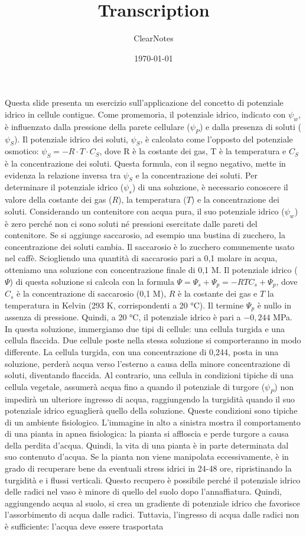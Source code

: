\documentclass[11pt, a4paper]{article}
\title{Transcription}
\author{ClearNotes}
\date{\today}
\begin{document}
\maketitle
\begin{spacing}{1.15}
Questa slide presenta un esercizio sull'applicazione del concetto di potenziale idrico in cellule contigue. Come promemoria, il potenziale idrico, indicato con $\psi_w$, è influenzato dalla pressione della parete cellulare ($\psi_P$) e dalla presenza di soluti ($\psi_S$). Il potenziale idrico dei soluti, $\psi_S$, è calcolato come l'opposto del potenziale osmotico: $\psi_S = -R \cdot T \cdot C_S$, dove R è la costante dei gas, T è la temperatura e $C_S$ è la concentrazione dei soluti. Questa formula, con il segno negativo, mette in evidenza la relazione inversa tra $\psi_S$ e la concentrazione dei soluti. Per determinare il potenziale idrico ($\psi_s$) di una soluzione, è necessario conoscere il valore della costante dei gas ($R$), la temperatura ($T$) e la concentrazione dei soluti. Considerando un contenitore con acqua pura, il suo potenziale idrico ($\psi_w$) è zero perché non ci sono soluti né pressioni esercitate dalle pareti del contenitore. Se si aggiunge saccarosio, ad esempio una bustina di zucchero, la concentrazione dei soluti cambia. Il saccarosio è lo zucchero comunemente usato nel caffè. Sciogliendo una quantità di saccarosio pari a 0,1 molare in acqua, otteniamo una soluzione con concentrazione finale di 0,1 M. Il potenziale idrico ($\Psi$) di questa soluzione si calcola con la formula $\Psi = \Psi_s + \Psi_p = -RTC_s + \Psi_p$, dove $C_s$ è la concentrazione di saccarosio (0,1 M), $R$ è la costante dei gas e $T$ la temperatura in Kelvin (293 K, corrispondenti a 20 °C).  Il termine $\Psi_p$ è nullo in assenza di pressione. Quindi, a 20 °C, il potenziale idrico è pari a $-0,244$ MPa. In questa soluzione, immergiamo due tipi di cellule: una cellula turgida e una cellula flaccida. Due cellule poste nella stessa soluzione si comporteranno in modo differente. La cellula turgida, con una concentrazione di 0,244, posta in una soluzione, perderà acqua verso l'esterno a causa della minore concentrazione di soluti, diventando flaccida. Al contrario, una cellula in condizioni tipiche di una cellula vegetale, assumerà acqua fino a quando il potenziale di turgore ($\psi_P$) non impedirà un ulteriore ingresso di acqua, raggiungendo la turgidità quando il suo potenziale idrico eguaglierà quello della soluzione. Queste condizioni sono tipiche di un ambiente fisiologico.  L'immagine in alto a sinistra mostra il comportamento di una pianta in apnea fisiologica: la pianta si affloscia e perde turgore a causa della perdita d'acqua. Quindi, la vita di una pianta è in parte determinata dal suo contenuto d'acqua. Se la pianta non viene manipolata eccessivamente, è in grado di recuperare bene da eventuali stress idrici in 24-48 ore, ripristinando la turgidità e i flussi verticali. Questo recupero è possibile perché il potenziale idrico delle radici nel vaso è minore di quello del suolo dopo l'annaffiatura. Quindi, aggiungendo acqua al suolo, si crea un gradiente di potenziale idrico che favorisce l'assorbimento di acqua dalle radici. Tuttavia, l'ingresso di acqua dalle radici non è sufficiente: l'acqua deve essere trasportata 
\end{spacing}
\end{document}
